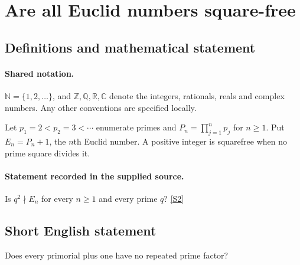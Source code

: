 \documentclass[11pt]{article}
\newcommand{\sref}[2]{\hyperlink{source:#1:#2}{[S#2]}}
\begin{document}
\section{Are all Euclid numbers square-free}\label{statement}

\subsection{Definitions and mathematical statement}

\paragraph{Shared notation.}$\mathbb N=\{1,2,\ldots\}$, and $\mathbb Z,\mathbb Q,\mathbb R,\mathbb C$ denote the integers, rationals, reals and complex numbers. Any other conventions are specified locally.


Let $p_1=2<p_2=3<\cdots$ enumerate primes and $P_n=\prod_{j=1}^{n}p_j$ for $n\ge1$. Put $E_n=P_n+1$, the $n$th Euclid number. A positive integer is squarefree when no prime square divides it.
\paragraph{Statement recorded in the supplied source.}
Is $q^2\nmid E_n$ for every $n\ge1$ and every prime $q$? \sref{statement}{2}
\subsection{Short English statement}
Does every primorial plus one have no repeated prime factor?
\end{document}
